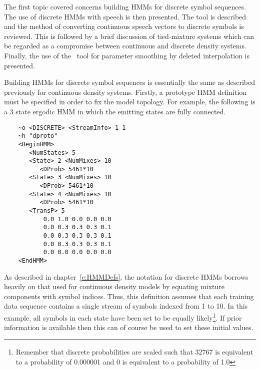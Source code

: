 The first topic covered concerns building HMMs for discrete
symbol sequences.  The use of discrete HMMs with speech is then
presented.  The tool  is described and the method
of converting continuous speech vectors to discrete symbols is
reviewed.  This is 
followed by a brief discussion of tied-mixture systems which can be 
regarded as a compromise between continuous and discrete density systems.
Finally, the use of the \HTK\ tool  for
parameter smoothing by deleted interpolation is presented.


Building HMMs for discrete symbol sequences is essentially the same
as described previously for continuous density systems. 
Firstly, a prototype HMM definition must be specified in order
to fix the model topology.  For example, the following
is a 3 state ergodic HMM in which the emitting states
are fully connected.
\begin{verbatim}
    ~o <DISCRETE> <StreamInfo> 1 1 
    ~h "dproto"
    <BeginHMM>
       <NumStates> 5 
       <State> 2 <NumMixes> 10
          <DProb> 5461*10
       <State> 3 <NumMixes> 10
          <DProb> 5461*10
       <State> 4 <NumMixes> 10
          <DProb> 5461*10
       <TransP> 5
           0.0 1.0 0.0 0.0 0.0
           0.0 0.3 0.3 0.3 0.1
           0.0 0.3 0.3 0.3 0.1
           0.0 0.3 0.3 0.3 0.1
           0.0 0.0 0.0 0.0 0.0
    <EndHMM>
\end{verbatim}
As described in chapter~\ref{c:HMMDefs}, the notation for discrete
HMMs borrows heavily on that used for continuous density models
by equating mixture components with symbol indices.  Thus,
this definition assumes that each training data sequence contains
a single stream of symbols indexed from 1 to 10.  In this example,
all symbols in each state have been set to be equally likely\footnote{
Remember that discrete probabilities are scaled such that
32767 is equivalent to a probability of 0.000001 and 0 is 
equivalent to a probability of 1.0
}.  If prior information is available then this can of course be used
to set these initial values.


